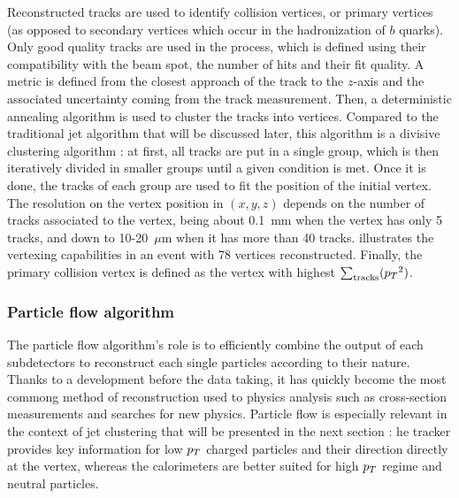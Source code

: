         Reconstructed tracks are used to identify collision vertices, or primary vertices
        (as opposed to secondary vertices which occur in the hadronization of $b$ quarks).
        Only good quality tracks are used in the process, which is defined using their
        compatibility with the beam spot, the number of hits and their fit quality. A
        metric is defined from the closest approach of the track to the $z$-axis and
        the associated uncertainty coming from the track measurement. Then, a deterministic
        annealing algorithm is used to cluster the tracks into vertices. Compared to the
        traditional jet algorithm that will be discussed later, this algorithm is a divisive
        clustering algorithm : at first, all tracks are put in a single group, which is then
        iteratively divided in smaller groups until a given condition is met. Once it is
        done, the tracks of each group are used to fit the position of the initial vertex.
        The resolution on the vertex position in $(x,y,z)$ depends on the number of tracks
        associated to the vertex, being about 0.1~mm when the vertex has only 5 tracks, and
        down to 10-20~$\mu$m when it has more than 40 tracks. 
        illustrates the vertexing capabilities in an event with 78 vertices reconstructed.
        Finally, the primary collision vertex is defined as the vertex with highest
        $\sum_\text{tracks} ({p_T}^2)$.


            \subsubsection{Particle flow algorithm}


        The particle flow algorithm's role is to efficiently combine the output of each
        subdetectors to reconstruct each single particles according to their nature. Thanks
        to a development before the data taking, it has quickly become the most commong
        method of reconstruction used to physics analysis such as cross-section measurements
        and searches for new physics. Particle flow is especially relevant in the context
        of jet clustering that will be presented in the next section : he tracker provides
        key information for low $p_T$ charged particles and their direction directly at the
        vertex, whereas the calorimeters are better suited for high $p_T$ regime and neutral
        particles.

